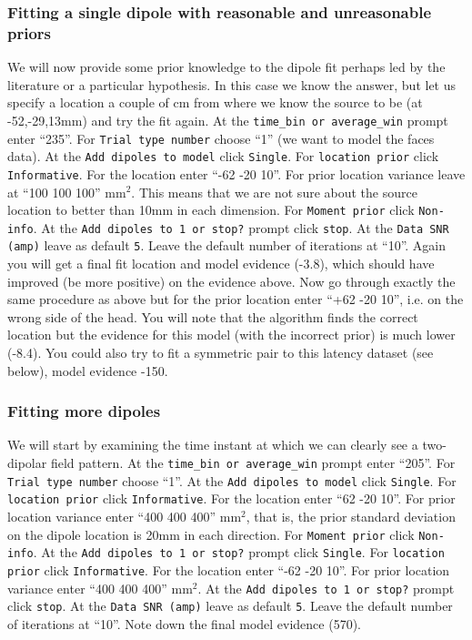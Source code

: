 \subsubsection{Fitting a single dipole with reasonable and unreasonable priors}
We will now provide some prior knowledge to the dipole fit perhaps led by the literature or a particular hypothesis. In this case we know the answer, but let us specify a location a couple of cm from where we know the source to be (at -52,-29,13mm) and try the fit again.
At the  \texttt{time\_bin or average\_win} prompt enter ``235''. For  \texttt{Trial type number} choose ``1'' (we want to model the faces data). At the  \texttt{Add dipoles to model} click  \texttt{Single}. For  \texttt{location prior} click  \texttt{Informative}. For the location enter ``-62 -20 10''. For prior location variance leave at ``100 100 100'' mm$^2$. This means that we are not sure about the source location to better than 10mm in each dimension. For  \texttt{Moment prior} click  \texttt{Non-info}. At the  \texttt{Add dipoles to 1 or stop?} prompt click  \texttt{stop}. At the \texttt{Data SNR (amp)} leave as default \texttt{5}. Leave the default number of iterations at ``10''. Again you will get a final fit location and model evidence (-3.8), which should have improved (be more positive) on the evidence above. 
Now go through exactly the same procedure as above but for the prior location enter ``+62 -20 10'', i.e. on the wrong side of the head. You will note that the algorithm finds the correct location but the evidence for this model (with the incorrect prior) is much lower (-8.4). You could also try to fit a symmetric pair to this latency dataset (see below), model evidence -150.

\subsubsection{Fitting more dipoles}
We will start by examining the time instant at which we can clearly see a two-dipolar field pattern.
At the \texttt{time\_bin or average\_win} prompt enter ``205''. For \texttt{Trial type number} choose ``1''. At the \texttt{Add dipoles to model} click \texttt{Single}. For \texttt{location prior} click \texttt{Informative}. For the location enter ``62 -20 10''. For prior location variance enter ``400 400 400'' mm$^2$, that is, the prior standard deviation on the dipole location is 20mm in each direction. For \texttt{Moment prior} click \texttt{Non-info}. At the \texttt{Add dipoles to 1 or stop?} prompt click \texttt{Single}. For \texttt{location prior} click \texttt{Informative}. For the location enter ``-62 -20 10''. For prior location variance enter ``400 400 400'' mm$^2$. At the \texttt{Add dipoles to 1 or stop?} prompt click \texttt{stop}. At the \texttt{Data SNR (amp)} leave as default \texttt{5}. Leave the default number of iterations at ``10''. Note down the final model evidence (570). 

